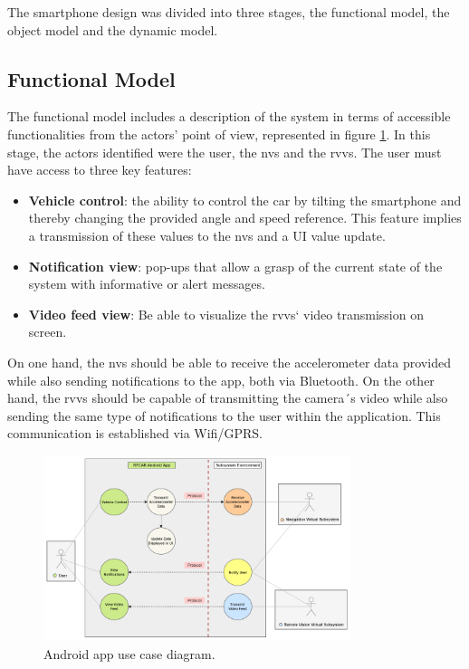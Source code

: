 The smartphone design was divided into three stages, the functional model, the object model and the dynamic model.

\subsection{Functional Model}
The functional model includes a description of the system in terms of accessible functionalities from the actors' point of view, represented in figure \ref{fig:usecase_android}.
%
In this stage, the actors identified were the user, the \gls{nvs} and the \gls{rvvs}. The user must have access to three key features:
% 
\begin{itemize}%
\item \textbf {Vehicle control}: the ability to control the car by tilting the smartphone and thereby changing the provided angle and speed reference. This feature implies a transmission of these values to the \gls{nvs} and a UI value update.
\item \textbf {Notification view}: pop-ups that allow a grasp of the current state of the system with informative or alert messages.
\item \textbf {Video feed view}: Be able to visualize the \gls{rvvs}` video transmission on screen.
\end{itemize}
%
On one hand, the \gls{nvs} should be able to receive the accelerometer data provided while also sending notifications to the app, both via Bluetooth.
%
On the other hand, the \gls{rvvs} should be capable of transmitting the camera´s video while also sending the same type of notifications to the user within the application. This communication is established via Wifi/GPRS.
%
\begin{figure}[!ht]
\centering
\includegraphics[width=0.8\textwidth]{img/UseCaseAndroid.png}
\caption{\label{fig:usecase_android}Android app use case diagram.}
\end{figure}
%
